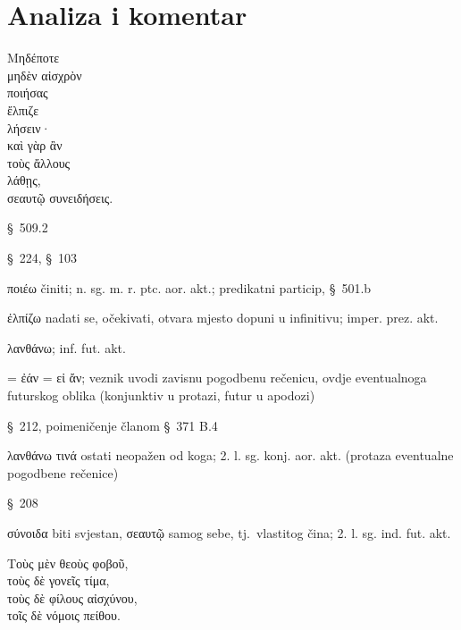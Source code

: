 \section*{Analiza i komentar}


{\large
\noindent Μηδέποτε \\
\tabto{2em} μηδὲν αἰσχρὸν \\
\tabto{2em} ποιήσας \\
ἔλπιζε \\
\tabto{2em} λήσειν·\\
καὶ γὰρ ἂν \\
\tabto{2em} τοὺς ἄλλους \\
\tabto{2em} λάθῃς, \\
σεαυτῷ συνειδήσεις.\\

}

\begin{description}[noitemsep]

\item[Μηδέποτε] §~509.2
\item[μηδὲν αἰσχρὸν] §~224, §~103
\item[ποιήσας] ποιέω činiti; n. sg. m. r. ptc. aor. akt.; predikatni particip, §~501.b
\item[ἔλπιζε] ἐλπίζω nadati se, očekivati, otvara mjesto dopuni u infinitivu; imper. prez. akt.
\item[λήσειν] λανθάνω; inf. fut. akt.
\item[ἂν] = ἐάν = εἰ ἄν; veznik uvodi zavisnu pogodbenu rečenicu, ovdje eventualnoga futurskog oblika (konjunktiv u protazi, futur u apodozi)
\item[τοὺς ἄλλους] §~212, poimeničenje članom §~371 B.4
\item[λάθῃς] λανθάνω τινά ostati neopažen od koga; 2. l. sg. konj. aor. akt. (protaza eventualne pogodbene rečenice)
\item[σεαυτῷ] §~208
\item[συνειδήσεις] σύνοιδα biti svjestan, σεαυτῷ samog sebe, tj.\ vlastitog čina; 2. l. sg. ind. fut. akt.
\end{description}

{\large
\noindent Τοὺς μὲν θεοὺς φοβοῦ, \\
τοὺς δὲ γονεῖς τίμα, \\
τοὺς δὲ φίλους αἰσχύνου, \\
τοῖς δὲ νόμοις πείθου.\\

}

